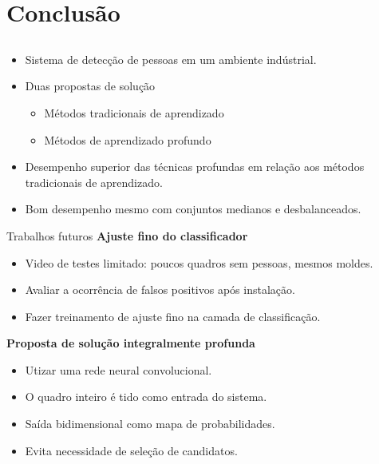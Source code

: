 \section{Conclusão}

\subsection{}
\begin{frame}{\insertsection}
	\begin{itemize}
		\item Sistema de detecção de pessoas em um ambiente indústrial.
		\item Duas propostas de solução
		\begin{itemize}
			\item Métodos tradicionais de aprendizado
			\item Métodos de aprendizado profundo
		\end{itemize}

		\item Desempenho superior das técnicas profundas em relação aos métodos tradicionais de aprendizado.
		\item Bom desempenho mesmo com conjuntos medianos e desbalanceados.
	\end{itemize}
\end{frame}

\begin{frame}{Trabalhos futuros}
	\textbf{Ajuste fino do classificador}\\
	\begin{itemize}
		\item Video de testes limitado: poucos quadros sem pessoas, mesmos moldes.
		\item Avaliar a ocorrência de falsos positivos após instalação.
		\item Fazer treinamento de ajuste fino na camada de classificação.
	\end{itemize} 

	\pause

	\textbf{Proposta de solução integralmente profunda}\\
	\begin{itemize}
		\item Utizar uma rede neural convolucional.
		\item O quadro inteiro é tido como entrada do sistema.
		\item Saída bidimensional como mapa de probabilidades.
		\item Evita necessidade de seleção de candidatos.
	\end{itemize}
\end{frame}
